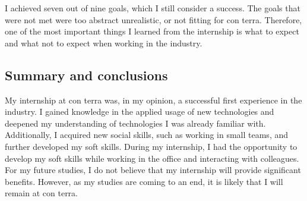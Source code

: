 \documentclass[11pt, titlepage, a4paper]{article}
\begin{document}
 I achieved seven out of nine goals, which I still consider a success. The goals that were not met were too abstract unrealistic, or not fitting for con terra. Therefore, one of the most important things I learned from the internship is what to expect and what not to expect when working in the industry.

 \subsection{Summary and conclusions}

 My internship at con terra was, in my opinion, a successful first experience in the industry. I gained knowledge in the applied usage of new technologies and deepened my understanding of technologies I was already familiar with. Additionally, I acquired new social skills, such as working in small teams, and further developed my soft skills. During my internship, I had the opportunity to develop my soft skills while working in the office and interacting with colleagues. 
 For my future studies, I do not believe that my internship will provide significant benefits. However, as my studies are coming to an end, it is likely that I will remain at con terra. 

 \clearpage
\end{document}
